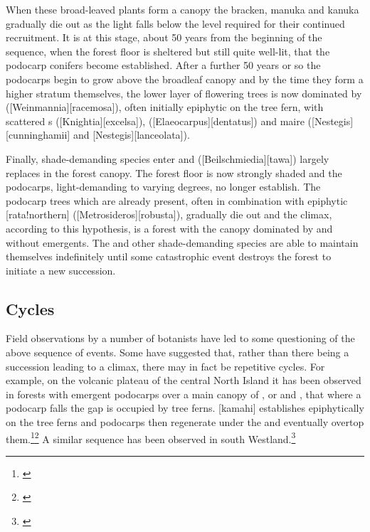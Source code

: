When these broad-leaved plants form a canopy the bracken, manuka and kanuka gradually die out as the light falls below the level required for their continued recruitment.
It is at this stage, about 50 years from the beginning of the sequence, when the forest floor is sheltered but still quite well-lit, that the podocarp conifers become established.
After a further 50 years or so the podocarps begin to grow above the broadleaf canopy and by the time they form a higher stratum themselves, the lower layer of flowering trees is now dominated by  ([Weinmannia][racemosa]), often initially epiphytic on the  tree fern, with scattered s ([Knightia][excelsa]),  ([Elaeocarpus][dentatus]) and maire ([Nestegis][cunninghamii] and [Nestegis][lanceolata]).

Finally, shade-demanding species enter and  ([Beilschmiedia][tawa]) largely replaces  in the forest canopy.
The forest floor is now strongly shaded and the podocarps, light-demanding to varying degrees, no longer establish.
The podocarp trees which are already present, often in combination with epiphytic [rata!northern] ([Metrosideros][robusta]), gradually die out and the climax, according to this hypothesis, is a forest with the canopy dominated by  and without emergents.
The  and other shade-demanding species are able to maintain themselves indefinitely until some catastrophic event destroys the forest to initiate a new succession.

\subsection[Cycles]{Cycles}

Field observations by a number of botanists have led to some questioning of the above sequence of events.
Some have suggested that, rather than there being a succession leading to a climax, there may in fact be repetitive cycles.
For example, on the volcanic plateau of the central North Island it has been observed in forests with emergent podocarps over a main canopy of , or  and , that where a podocarp falls the gap is occupied by tree ferns.
[kamahi] establishes epiphytically on the tree ferns and podocarps then regenerate under the  and eventually overtop them.\footnote{\cite{cameron1955mosaic}}\footnote{\cite{beveridge1973regeneration}} A similar sequence has been observed in south Westland.\footnote{\cite{poole1937survey}}

